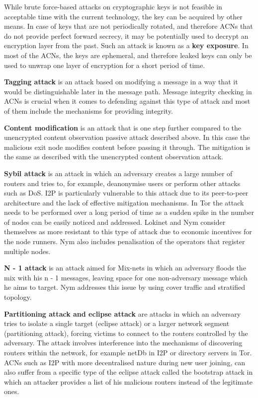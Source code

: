 While brute force-based attacks on cryptographic keys is not feasible in acceptable time with the current technology, the key can be acquired by other means. In case of keys that are not periodically rotated, and therefore ACNs that do not provide perfect forward secrecy, it may be potentially used to decrypt an encryption layer from the past. Such an attack is known as a \textbf{key exposure}. In most of the ACNs, the keys are ephemeral, and therefore leaked keys can only be used to unwrap one layer of encryption for a short period of time.

\textbf{Tagging attack} is an attack based on modifying a message in a way that it would be distinguishable later in the message path. Message integrity checking in ACNs is crucial when it comes to defending against this type of attack and most of them include the mechanisms for providing integrity.

\textbf{Content modification} is an attack that is one step further compared to the unencrypted content observation passive attack described above. In this case the malicious exit node modifies content before passing it through. The mitigation is the same as described with the unencrypted content observation attack.

\textbf{Sybil attack} is an attack in which an adversary creates a large number of routers and tries to, for example, deanonymise users or perform other attacks such as DoS. I2P is particularly vulnerable to this attack due to its peer-to-peer architecture and the lack of effective mitigation mechanisms. In Tor the attack needs to be performed over a long period of time as a sudden spike in the number of nodes can be easily noticed and addressed. Lokinet and Nym consider themselves as more resistant to this type of attack due to economic incentives for the node runners. Nym also includes penalisation of the operators that register multiple nodes.

\textbf{N - 1 attack} is an attack aimed for Mix-nets in which an adversary floods the mix with his n - 1 messages, leaving space for one non-adversary message which he aims to target. Nym addresses this issue by using cover traffic and stratified topology.

\textbf{Partitioning attack and eclipse attack} are attacks in which an adversary tries to isolate a single target (eclipse attack) or a larger network segment (partitioning attack), forcing victims to connect to the routers controlled by the adversary. The attack involves interference into the mechanisms of discovering routers within the network, for example netDb in I2P or directory servers in Tor. ACNs such as I2P with more decentralised nature during new user joining, can also suffer from a specific type of the eclipse attack called the bootstrap attack in which an attacker provides a list of his malicious routers instead of the legitimate ones.

